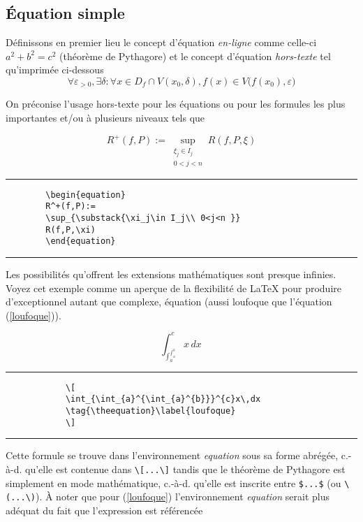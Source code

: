 	\subsection*{Équation simple}
	Définissons en premier lieu le concept d'équation \textit{en-ligne} comme celle-ci $a^2+b^2=c^2$ (théorème de Pythagore) et le concept d'équation  \textit{hors-texte}  tel qu'imprimée ci-dessous 
	\[
	\forall\varepsilon_{>0},\exists\delta : \forall x \in D_f \cap V(x_0,\delta), f(x)\in V\big(f(x_0),\varepsilon\big)
	\]
	\par On préconise l'usage hors-texte pour les équations ou pour les formules les plus importantes et/ou à plusieurs niveaux tels que
%
	\begin{table}[H]
		\centering
		\begin{equation}
		R^+(f,P):=\sup_{\substack{\xi_j\in I_j \\
				0<j<n }}
		R(f,P,\xi)\label{darboux}
		\end{equation}	
		\hrule
		\begin{verbatim}
		\begin{equation}
		R^+(f,P):=
		\sup_{\substack{\xi_j\in I_j\\ 0<j<n }}
		R(f,P,\xi)
		\end{equation}
		\end{verbatim}
		\hrule
	\end{table}
%
	\par Les possibilités qu'offrent les extensions mathématiques sont presque infinies. Voyez cet exemple comme un aperçue de la flexibilité de \LaTeX{} pour produire d'exceptionnel autant que complexe, équation (aussi loufoque que l'équation (\ref{loufoque})).
%
	\begin{table}[H]
		\setcounter{equation}{2}
		\centering
		\[
		\int_{\int_{a}^{\int_{a}^{b}}}^{c}x\,dx\, 
		\tag{\theequation}\label{loufoque}
		\]
		\hrule
		\begin{verbatim}
			\[
			\int_{\int_{a}^{\int_{a}^{b}}}^{c}x\,dx
			\tag{\theequation}\label{loufoque}
			\]
		\end{verbatim}
		\hrule
	\end{table}
%
	\par Cette formule se trouve dans l'environnement \textit{equation} sous sa forme abrégée, c.-à-d. qu'elle est contenue dans \verb|\[...\]| tandis que le théorème de Pythagore est simplement en mode mathématique, c.-à-d. qu'elle est inscrite entre  \verb|$...$| (ou \verb|\(...\)|). À noter que pour (\ref{loufoque}) l'environnement \textit{equation} serait plus adéquat du fait que l'expression est référencée%

